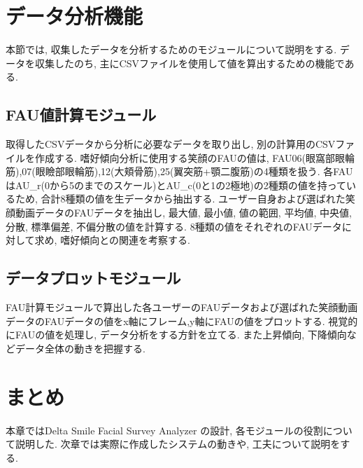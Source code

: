 \section{データ分析機能}
本節では, 収集したデータを分析するためのモジュールについて説明をする.
データを収集したのち, 主にCSVファイルを使用して値を算出するための機能である.

\subsection{FAU値計算モジュール}
取得したCSVデータから分析に必要なデータを取り出し, 別の計算用のCSVファイルを作成する.
嗜好傾向分析に使用する笑顔のFAUの値は, FAU06(眼窩部眼輪筋),07(眼瞼部眼輪筋),12(大頬骨筋),25(翼突筋+顎二腹筋)の4種類を扱う.
各FAUはAU\_r(0から5のまでのスケール)とAU\_c(0と1の2極地)の2種類の値を持っているため, 合計8種類の値を生データから抽出する.
ユーザー自身および選ばれた笑顔動画データのFAUデータを抽出し, 最大値, 最小値, 値の範囲, 平均値, 中央値, 分散, 標準偏差, 不偏分散の値を計算する.
8種類の値をそれぞれのFAUデータに対して求め, 嗜好傾向との関連を考察する.


\subsection{データプロットモジュール}
FAU計算モジュールで算出した各ユーザーのFAUデータおよび選ばれた笑顔動画データのFAUデータの値をx軸にフレーム,y軸にFAUの値をプロットする.
視覚的にFAUの値を処理し, データ分析をする方針を立てる. また上昇傾向, 下降傾向などデータ全体の動きを把握する.

\section{まとめ}
本章ではDelta Smile Facial Survey Analyzer の設計, 各モジュールの役割について説明した.
次章では実際に作成したシステムの動きや, 工夫について説明をする.
